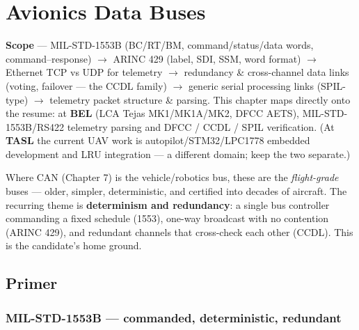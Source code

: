 
\chapter{Avionics Data Buses}
\label{ch:avionics-buses}

\begin{partnote}
\textbf{Scope} --- MIL-STD-1553B (BC/RT/BM, command/status/data words,
command--response) $\rightarrow$ ARINC 429 (label, SDI, SSM, word format)
$\rightarrow$ Ethernet TCP vs UDP for telemetry $\rightarrow$ redundancy \&
cross-channel data links (voting, failover --- the CCDL family) $\rightarrow$
generic serial processing links (SPIL-type) $\rightarrow$ telemetry packet
structure \& parsing. This chapter maps directly onto the resume: at \textbf{BEL}
(LCA Tejas MK1/MK1A/MK2, DFCC AETS), MIL-STD-1553B/RS422 telemetry parsing and
DFCC / CCDL / SPIL verification. (At \textbf{TASL} the current UAV work is
autopilot/STM32/LPC1778 embedded development and LRU integration --- a different
domain; keep the two separate.)
\end{partnote}

Where CAN (Chapter 7) is the vehicle/robotics bus, these are the
\emph{flight-grade} buses --- older, simpler, deterministic, and certified into
decades of aircraft. The recurring theme is \textbf{determinism and
redundancy}: a single bus controller commanding a fixed schedule (1553),
one-way broadcast with no contention (ARINC 429), and redundant channels that
cross-check each other (CCDL). This is the candidate's home ground.

\section{Primer}

\subsection{MIL-STD-1553B --- commanded, deterministic, redundant}

